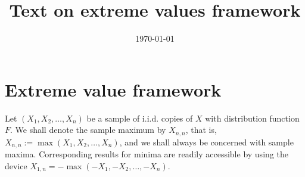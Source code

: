 \documentclass[10pt, a4paper, oneside]{article}
\title{Text on extreme values framework}
\date{\today}
\begin{document}
\maketitle










\section{Extreme value framework}
Let $(X_1,X_2, \ldots, X_n)$ be a sample of i.i.d. copies of $X$ with distribution function $F$. We shall denote the sample maximum by $X_{n,n}$, that is, $X_{n,n}:= \max(X_1,X_2, \ldots, X_n)$, and we shall always be concerned with sample maxima. Corresponding results for minima are readily accessible by using the device $X_{1,n} = -\max(-X_1,-X_2, \ldots, -X_n)$.
\end{document}
